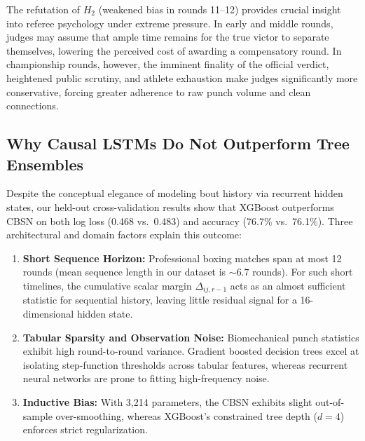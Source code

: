 \documentclass[conference]{IEEEtran}
\begin{document}
The refutation of $H_2$ (weakened bias in rounds 11--12) provides crucial insight into referee psychology under extreme pressure. In early and middle rounds, judges may assume that ample time remains for the true victor to separate themselves, lowering the perceived cost of awarding a compensatory round. In championship rounds, however, the imminent finality of the official verdict, heightened public scrutiny, and athlete exhaustion make judges significantly more conservative, forcing greater adherence to raw punch volume and clean connections.

\subsection{Why Causal LSTMs Do Not Outperform Tree Ensembles}
Despite the conceptual elegance of modeling bout history via recurrent hidden states, our held-out cross-validation results show that XGBoost outperforms CBSN on both log loss (0.468 vs.\ 0.483) and accuracy (76.7\% vs.\ 76.1\%). Three architectural and domain factors explain this outcome:
\begin{enumerate}
    \item \textbf{Short Sequence Horizon:} Professional boxing matches span at most 12 rounds (mean sequence length in our dataset is $\sim 6.7$ rounds). For such short timelines, the cumulative scalar margin $\Delta_{ij,r-1}$ acts as an almost sufficient statistic for sequential history, leaving little residual signal for a 16-dimensional hidden state.
    \item \textbf{Tabular Sparsity and Observation Noise:} Biomechanical punch statistics exhibit high round-to-round variance. Gradient boosted decision trees excel at isolating step-function thresholds across tabular features, whereas recurrent neural networks are prone to fitting high-frequency noise.
    \item \textbf{Inductive Bias:} With 3,214 parameters, the CBSN exhibits slight out-of-sample over-smoothing, whereas XGBoost's constrained tree depth ($d=4$) enforces strict regularization.
\end{enumerate}
\end{document}
